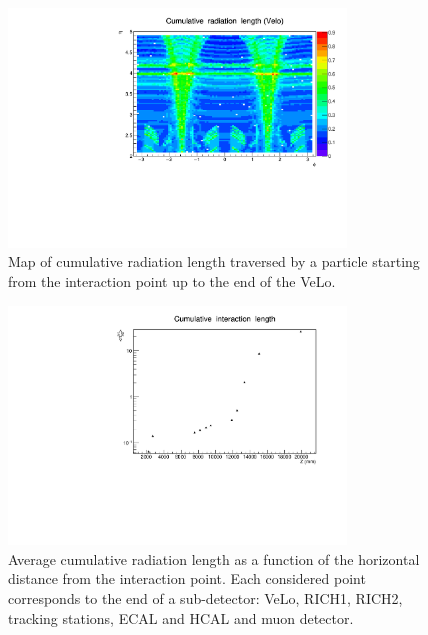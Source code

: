 \begin{center}
\begin{figure}[h]
\centering \includegraphics[width=0.8\textwidth]{Detector/figs/validation/radlenght/radlgh_prof_ID1.pdf}
\caption{Map of cumulative radiation length traversed by a particle starting from
the interaction point up to the end of the VeLo.}
\label{fig:radlmap}
\end{figure}

\begin{figure}[h!]
\centering \includegraphics[width=0.8\textwidth]{Detector/figs/validation/radlenght/cuminterLength_vs_Z.pdf}
\caption{Average cumulative radiation length as a function of the horizontal 
distance from the interaction point. Each considered point corresponds to the end of a sub-detector:
VeLo, RICH1, RICH2, tracking stations, ECAL and HCAL and muon detector. 
}
\label{fig:cumradlZ}
\end{figure}
\end{center}


